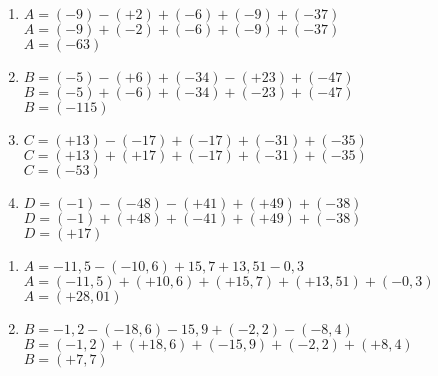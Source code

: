 \documentclass[11pt]{article}
\begin{document}
\begin{exercicedevoir}
\begin{multicols}{2}
\begin{enumerate}[itemsep=1em,label={}]
\item  $ A =  (-9)-(+2)+(-6)+(-9)+(-37)$\\$ A = (-9)+ (-2) + (-6) +
(-9) + (-37)$ \\$ A = (-63)$
\item  $ B =  (-5)-(+6)+(-34)-(+23)+(-47)$\\$ B = (-5)+(-6)+(-34)+(-23)+(-47)$ \\$ B = (-115)$
\item  $ C =  (+13)-(-17)+(-17)+(-31)+(-35)$\\$ C = (+13)+(+17)+(-17)+(-31)+(-35)$ \\$ C = (-53)$
\item  $ D =  (-1)-(-48)-(+41)+(+49)+(-38)$\\$ D = (-1)+(+48)+(-41)+(+49)+(-38)$ \\$ D = (+17)$
\end{enumerate}
\end{multicols}
\end{exercicedevoir}

\begin{exercicedevoir}
\begin{multicols}{2}
\begin{enumerate}[itemsep=1em,label={}]
\item  $ A =  -11{,}5-(-10{,}6)+15{,}7+13{,}51-0{,}3$\\$ A = (-11{,}5) +
(+10{,}6) + (+15{,}7) + (+13{,}51) + (-0{,}3)$ \\$ A = (+28{,}01)$
\item  $ B =  -1{,}2-(-18{,}6)-15{,}9+(-2{,}2)-(-8{,}4)$\\$ B =
(-1{,}2) + (+18{,}6) + (-15{,}9) + (-2{,}2) + (+8{,}4)$ \\$ B = (+7{,}7)$
\end{enumerate}
\end{multicols}
\end{exercicedevoir}
\end{document}
